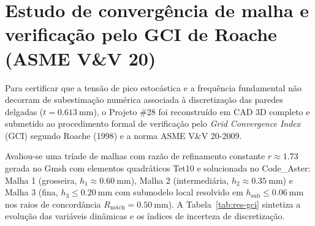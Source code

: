 \section{Estudo de convergência de malha e verificação pelo GCI de Roache (ASME V\&V 20)}
\label{sec:res-mesh-gci}

Para certificar que a tensão de pico estocástica e a frequência fundamental não decorram de subestimação numérica associada à discretização das paredes delgadas ($t = \SI{0.613}{\milli\metre}$), o Projeto \#28 foi reconstruído em CAD 3D completo e submetido ao procedimento formal de verificação pelo \textit{Grid Convergence Index} (GCI) segundo Roache (1998) e a norma ASME V\&V 20-2009.

Avaliou-se uma tríade de malhas com razão de refinamento constante $r \approx \num{1.73}$ gerada no Gmsh com elementos quadráticos Tet10 e solucionada no Code\_Aster: Malha 1 (grosseira, $h_1 \approx \SI{0.60}{\milli\metre}$), Malha 2 (intermediária, $h_2 \approx \SI{0.35}{\milli\metre}$) e Malha 3 (fina, $h_3 \le \SI{0.20}{\milli\metre}$ com submodelo local resolvido em $h_{\text{sub}} \le \SI{0.06}{\milli\metre}$ nos raios de concordância $R_{\text{notch}} = \SI{0.50}{\milli\metre}$). A Tabela~\ref{tab:res-gci} sintetiza a evolução das variáveis dinâmicas e os índices de incerteza de discretização.

